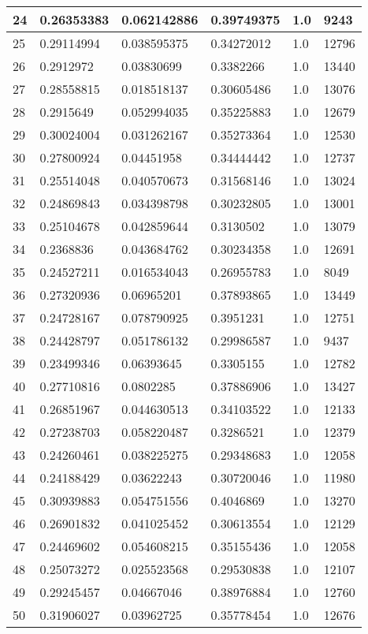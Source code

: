 \begin{longtable}{|l|l|l|l|l|l|}
24 & 0.26353383 & 0.062142886 & 0.39749375 & 1.0 & 9243 \\ \hline 
25 & 0.29114994 & 0.038595375 & 0.34272012 & 1.0 & 12796 \\ \hline 
26 & 0.2912972 & 0.03830699 & 0.3382266 & 1.0 & 13440 \\ \hline 
27 & 0.28558815 & 0.018518137 & 0.30605486 & 1.0 & 13076 \\ \hline 
28 & 0.2915649 & 0.052994035 & 0.35225883 & 1.0 & 12679 \\ \hline 
29 & 0.30024004 & 0.031262167 & 0.35273364 & 1.0 & 12530 \\ \hline 
30 & 0.27800924 & 0.04451958 & 0.34444442 & 1.0 & 12737 \\ \hline 
31 & 0.25514048 & 0.040570673 & 0.31568146 & 1.0 & 13024 \\ \hline 
32 & 0.24869843 & 0.034398798 & 0.30232805 & 1.0 & 13001 \\ \hline 
33 & 0.25104678 & 0.042859644 & 0.3130502 & 1.0 & 13079 \\ \hline 
34 & 0.2368836 & 0.043684762 & 0.30234358 & 1.0 & 12691 \\ \hline 
35 & 0.24527211 & 0.016534043 & 0.26955783 & 1.0 & 8049 \\ \hline 
36 & 0.27320936 & 0.06965201 & 0.37893865 & 1.0 & 13449 \\ \hline 
37 & 0.24728167 & 0.078790925 & 0.3951231 & 1.0 & 12751 \\ \hline 
38 & 0.24428797 & 0.051786132 & 0.29986587 & 1.0 & 9437 \\ \hline 
39 & 0.23499346 & 0.06393645 & 0.3305155 & 1.0 & 12782 \\ \hline 
40 & 0.27710816 & 0.0802285 & 0.37886906 & 1.0 & 13427 \\ \hline 
41 & 0.26851967 & 0.044630513 & 0.34103522 & 1.0 & 12133 \\ \hline 
42 & 0.27238703 & 0.058220487 & 0.3286521 & 1.0 & 12379 \\ \hline 
43 & 0.24260461 & 0.038225275 & 0.29348683 & 1.0 & 12058 \\ \hline 
44 & 0.24188429 & 0.03622243 & 0.30720046 & 1.0 & 11980 \\ \hline 
45 & 0.30939883 & 0.054751556 & 0.4046869 & 1.0 & 13270 \\ \hline 
46 & 0.26901832 & 0.041025452 & 0.30613554 & 1.0 & 12129 \\ \hline 
47 & 0.24469602 & 0.054608215 & 0.35155436 & 1.0 & 12058 \\ \hline 
48 & 0.25073272 & 0.025523568 & 0.29530838 & 1.0 & 12107 \\ \hline 
49 & 0.29245457 & 0.04667046 & 0.38976884 & 1.0 & 12760 \\ \hline 
50 & 0.31906027 & 0.03962725 & 0.35778454 & 1.0 & 12676 \\ \hline 
\end{longtable}
